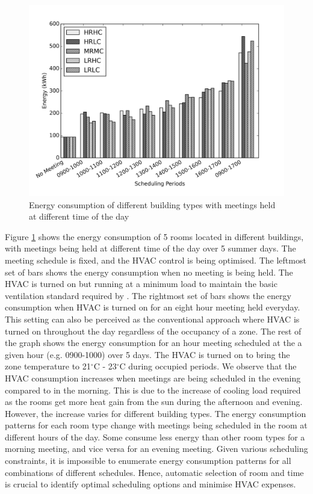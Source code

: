 \begin{figure}
	\centering
		\includegraphics[width=0.74\linewidth,keepaspectratio]{./figs/mip_room_energy.png}		
	\caption{Energy consumption of different building types with meetings held at different time of the day}
	\label{fig:mip_re}
\end{figure}

Figure \ref{fig:mip_re} shows the energy consumption of 5 rooms located in different buildings, with meetings being held at different time of the day over 5 summer days. The meeting schedule is fixed, and the HVAC control is being optimised. The leftmost set of bars shows the energy consumption when no meeting is being held. The HVAC is turned on but running at a minimum load to maintain the basic ventilation standard required by \cite{ashrae2013thermal}. The rightmost set of bars shows the energy consumption when HVAC is turned on for an eight hour meeting held everyday. This setting can also be perceived as the conventional approach where HVAC is turned on throughout the day regardless of the occupancy of a zone. The rest of the graph shows the energy consumption for an hour meeting scheduled at the a given hour (e.g. 0900-1000) over 5 days. The HVAC is turned on to bring the zone temperature to 21$^\circ$C - 23$^\circ$C during occupied periods. We observe that the HVAC consumption increases when meetings are being scheduled in the evening compared to in the morning. This is due to the increase of cooling load required as the rooms get more heat gain from the sun during the afternoon and evening. However, the increase varies for different building types. The energy consumption patterns for each room type change with meetings being scheduled in the room at different hours of the day. Some consume less energy than other room types for a morning meeting, and vice versa for an evening meeting. Given various scheduling constraints, it is impossible to enumerate energy consumption patterns for all combinations of different schedules. Hence, automatic selection of room and time is crucial to identify optimal scheduling options and minimise HVAC expenses. 

